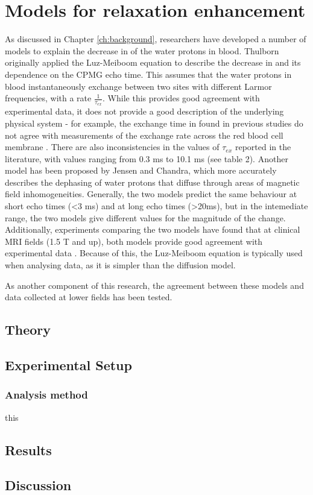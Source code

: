 \chapter{Models for \Ttwo relaxation enhancement}\label{ch:models}

As discussed in Chapter \ref{ch:background}, researchers have developed a number of models to explain the decrease in \Ttwo of the water protons in blood.
Thulborn originally applied the Luz-Meiboom equation to describe the decrease in \Ttwo and its dependence on the CPMG echo time\cite{ThulbornOxygenationdependencetransverse1982}.
This assumes that the water protons in blood instantaneously exchange between two sites with different Larmor frequencies, with a rate $\frac{1}{\tau_{ex}}$.
While this provides good agreement with experimental data, it does not provide a good description of the underlying physical system - for example, the exchange time in found in previous studies do not agree with measurements of the exchange rate across the red blood cell membrane \cite{MeyerNMRrelaxationrates1995}.
There are also inconsistencies in the values of $\tau_{ex}$ reported in the literature, with values ranging from 0.3 ms to 10.1 ms (see table 2).
Another model has been proposed by Jensen and Chandra, which more accurately describes the dephasing of water protons that diffuse through areas of magnetic field inhomogeneities\cite{JensenNMRrelaxationtissues2000}.
Generally, the two models predict the same behaviour at short echo times (<3 ms) and at long echo times (>20ms)\cite{BrooksT2shorteningweaklymagnetized2001}, but in the intemediate range, the two models give different values for the magnitude of the \Ttwo change.
Additionally, experiments comparing the two models have found that at clinical MRI fields (1.5 T and up), both models provide good agreement with experimental data \cite{StefanovicHumanwholebloodrelaxometry2004,GardenerDependencebloodR22010,GrgacHematocritoxygenationdependence2013}.
Because of this, the Luz-Meiboom equation is typically used when analysing data, as it is simpler than the diffusion model.

As another component of this research, the agreement between these models and data collected at lower fields has been tested.

\section{Theory}

\section{Experimental Setup}

\subsection*{Analysis method}
this
\section{Results}

\section{Discussion}
